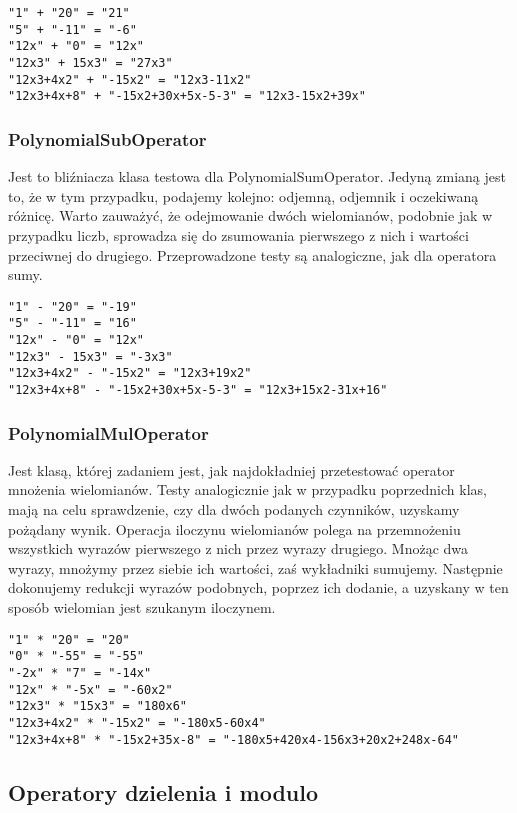 \documentclass[twoside,a4paper]{book}
\begin{document}
\begin{lstlisting}
"1" + "20" = "21"
"5" + "-11" = "-6"
"12x" + "0" = "12x"
"12x3" + 15x3" = "27x3"
"12x3+4x2" + "-15x2" = "12x3-11x2"
"12x3+4x+8" + "-15x2+30x+5x-5-3" = "12x3-15x2+39x"
\end{lstlisting}

\subsubsection{PolynomialSubOperator}

Jest to bliźniacza klasa testowa dla PolynomialSumOperator. Jedyną zmianą jest to, że w tym przypadku, podajemy kolejno: odjemną, odjemnik i oczekiwaną różnicę. Warto zauważyć, że odejmowanie dwóch wielomianów, podobnie jak w przypadku liczb, sprowadza się do zsumowania pierwszego z nich i wartości przeciwnej do drugiego. Przeprowadzone testy są analogiczne, jak dla operatora sumy.

\begin{lstlisting}
"1" - "20" = "-19"
"5" - "-11" = "16"
"12x" - "0" = "12x"
"12x3" - 15x3" = "-3x3"
"12x3+4x2" - "-15x2" = "12x3+19x2"
"12x3+4x+8" - "-15x2+30x+5x-5-3" = "12x3+15x2-31x+16"
\end{lstlisting}

\subsubsection{PolynomialMulOperator}

Jest klasą, której zadaniem jest, jak najdokładniej przetestować operator mnożenia wielomianów. Testy analogicznie jak w przypadku poprzednich klas, mają na celu sprawdzenie, czy dla dwóch podanych czynników, uzyskamy pożądany wynik. Operacja iloczynu wielomianów polega na przemnożeniu wszystkich wyrazów pierwszego z nich przez wyrazy drugiego. Mnożąc dwa wyrazy, mnożymy przez siebie ich wartości, zaś wykładniki sumujemy. Następnie dokonujemy redukcji wyrazów podobnych, poprzez ich dodanie, a uzyskany w ten sposób wielomian jest szukanym iloczynem.

\begin{lstlisting}
"1" * "20" = "20"
"0" * "-55" = "-55"
"-2x" * "7" = "-14x"
"12x" * "-5x" = "-60x2"
"12x3" * "15x3" = "180x6"
"12x3+4x2" * "-15x2" = "-180x5-60x4"
"12x3+4x+8" * "-15x2+35x-8" = "-180x5+420x4-156x3+20x2+248x-64"
\end{lstlisting}

\subsection{Operatory dzielenia i modulo}
\end{document}
